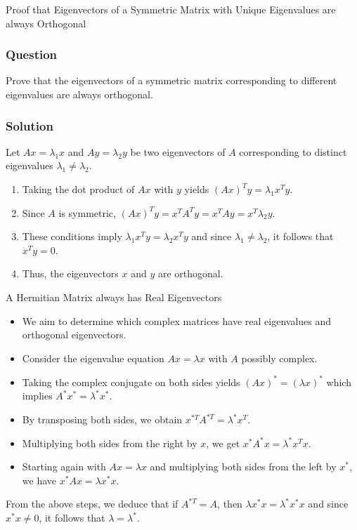 \begin{examplebox}{Proof that Eigenvectors of a Symmetric Matrix with Unique Eigenvalues are always Orthogonal}
\subsubsection*{Question}
Prove that the eigenvectors of a symmetric matrix corresponding to different eigenvalues are always orthogonal.

\subsubsection*{Solution}

Let \( Ax = \lambda_1 x \) and \( Ay = \lambda_2 y \) be two eigenvectors of \( A \) corresponding to distinct eigenvalues \( \lambda_1 \neq \lambda_2 \).

\begin{enumerate}
    \item Taking the dot product of \( Ax \) with \( y \) yields \( (Ax)^T y = \lambda_1 x^T y \).
    \item Since \( A \) is symmetric, \( (Ax)^T y = x^T A^T y = x^T Ay = x^T \lambda_2 y \).
    \item These conditions imply \( \lambda_1 x^T y = \lambda_2 x^T y \) and since \( \lambda_1 \neq \lambda_2 \), it follows that \( x^T y = 0 \).
    \item Thus, the eigenvectors \( x \) and \( y \) are orthogonal.
\end{enumerate}



\end{examplebox}




\begin{definitionbox}{A Hermitian Matrix always has Real Eigenvectors}
\begin{itemize}
    \item We aim to determine which complex matrices have real eigenvalues and orthogonal eigenvectors.
    \item Consider the eigenvalue equation \( Ax = \lambda x \) with \( A \) possibly complex.
    \item Taking the complex conjugate on both sides yields \( (Ax)^* = (\lambda x)^* \) which implies \( A^* x^* = \lambda^* x^* \).
    \item By transposing both sides, we obtain \( x^{*T} A^{*T} = \lambda^* x^T \).
    \item Multiplying both sides from the right by \( x \), we get \( x^* A^* x = \lambda^* x^T x \).
    \item Starting again with \( Ax = \lambda x \) and multiplying both sides from the left by \( x^* \), we have \( x^* Ax = \lambda x^* x \).
\end{itemize}
    From the above steps, we deduce that if \( A^{*T} = A \), then \( \lambda x^* x = \lambda^* x^* x \) and since \( x^* x \neq 0 \), it follows that \( \lambda = \lambda^* \).
\end{definitionbox}

